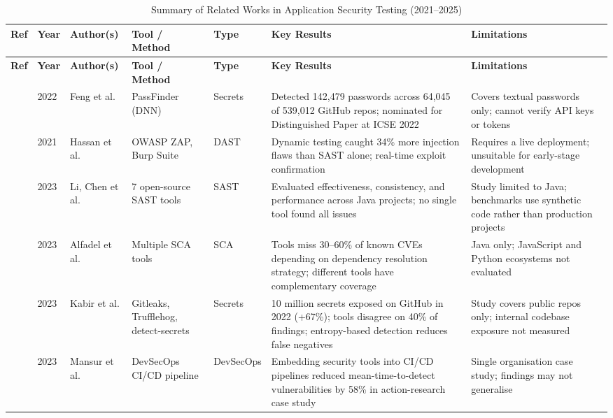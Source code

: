 \documentclass[12pt,a4paper]{report}
\begin{document}
\begin{longtable}{|p{0.4cm}|p{0.8cm}|p{2.4cm}|p{2.3cm}|p{1.5cm}|p{3.5cm}|p{3.2cm}|}
\caption{Summary of Related Works in Application Security Testing (2021--2025)}
\label{tab:litreview} \\
\hline
\textbf{Ref} & \textbf{Year} & \textbf{Author(s)} & \textbf{Tool / Method} & \textbf{Type} & \textbf{Key Results} & \textbf{Limitations} \\
\hline
\endfirsthead
\hline
\textbf{Ref} & \textbf{Year} & \textbf{Author(s)} & \textbf{Tool / Method} & \textbf{Type} & \textbf{Key Results} & \textbf{Limitations} \\
\hline
\endhead
\hline
\endfoot

\cite{feng2022} & 2022 & Feng et al. & PassFinder (DNN) & Secrets & Detected 142,479 passwords across 64,045 of 539,012 GitHub repos; nominated for Distinguished Paper at ICSE 2022 & Covers textual passwords only; cannot verify API keys or tokens \\
\hline
\cite{hassan2021} & 2021 & Hassan et al. & OWASP ZAP, Burp Suite & DAST & Dynamic testing caught 34\% more injection flaws than SAST alone; real-time exploit confirmation & Requires a live deployment; unsuitable for early-stage development \\
\hline
\cite{li2023} & 2023 & Li, Chen et al. & 7 open-source SAST tools & SAST & Evaluated effectiveness, consistency, and performance across Java projects; no single tool found all issues & Study limited to Java; benchmarks use synthetic code rather than production projects \\
\hline
\cite{alfadel2023} & 2023 & Alfadel et al. & Multiple SCA tools & SCA & Tools miss 30--60\% of known CVEs depending on dependency resolution strategy; different tools have complementary coverage & Java only; JavaScript and Python ecosystems not evaluated \\
\hline
\cite{kabir2023} & 2023 & Kabir et al. & Gitleaks, Trufflehog, detect-secrets & Secrets & 10 million secrets exposed on GitHub in 2022 (+67\%); tools disagree on 40\% of findings; entropy-based detection reduces false negatives & Study covers public repos only; internal codebase exposure not measured \\
\hline
\cite{mansur2023} & 2023 & Mansur et al. & DevSecOps CI/CD pipeline & DevSecOps & Embedding security tools into CI/CD pipelines reduced mean-time-to-detect vulnerabilities by 58\% in action-research case study & Single organisation case study; findings may not generalise \\

\end{longtable}
\end{document}
